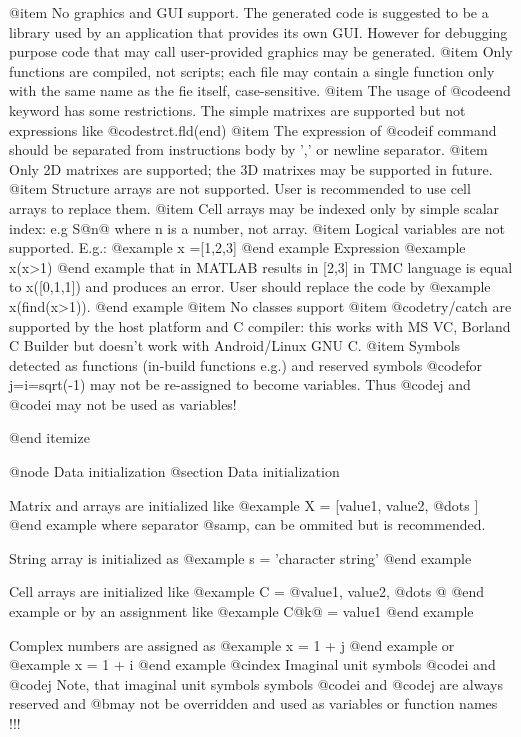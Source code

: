 @item
 No graphics and GUI support. The generated code is suggested to be a library used by an application that provides its own GUI. However for debugging purpose code that may call user-provided graphics may be generated.
@item Only functions are compiled, not scripts; each file may contain a single function only with the same name as the fie itself, case-sensitive. 
@item The usage of @code{end} keyword has some restrictions. The simple matrixes are supported but not expressions like @code{strct.fld(end)}
@item The expression of @code{if} command should be separated from instructions body by ',' or newline separator.
@item Only 2D matrixes are supported; the 3D matrixes may be supported in future.
@item Structure arrays are not supported. User is recommended to use cell arrays to replace them.
@item Cell arrays may be indexed only by simple scalar index: e.g S@{n@} where n is a number, not array.
@item Logical variables are not supported. E.g.:
@example
 x =[1,2,3]
@end example
     Expression
@example
 x(x>1) 
@end example
that in MATLAB results in [2,3] in TMC language is equal to x([0,1,1]) and produces an error. User should
      replace the code by 
@example
x(find(x>1)).
@end example
@item No classes support
@item  @code{try/catch}  are supported by the host platform and C compiler: this works with MS VC, Borland C Builder but doesn't work with Android/Linux GNU C.
@item Symbols detected as functions (in-build functions e.g.) and reserved symbols @code{for j=i=sqrt(-1)} may not be re-assigned to become variables. Thus @code{j} and @code{i} may not be used as variables! 

@end itemize

@node Data initialization
@section Data initialization

Matrix and arrays are initialized like
@example
 X =  [value1, value2, @dots{}  ]
@end example
where separator  @samp{,} can be ommited but is recommended. 

String array is initialized as
@example
 s = 'character string'
@end example

Cell arrays are initialized like
@example
 C =  @{value1, value2, @dots{}  @}
@end example
or by an assignment like
@example
 C@{k@} = value1
@end example

Complex numbers are assigned as
@example
x = 1 + j
@end example
or
@example
x = 1 + i
@end example
@cindex Imaginal unit symbols @code{i} and @code{j} 
Note, that imaginal unit symbols symbols @code{i} and @code{j} are always reserved and @b{may not be   overridden} and used as variables or function names !!!

